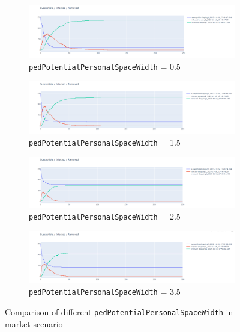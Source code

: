 \begin{figure}[H]
    \centering
    \begin{subfigure}[t]{\textwidth}
        \centering
        \includegraphics[width=\linewidth]{images/task5_shopping1.png}
        \caption{\texttt{pedPotentialPersonalSpaceWidth} = 0.5}
        \label{fig:t5-s1}
    \end{subfigure}%

    \begin{subfigure}[t]{\textwidth}
        \centering
        \includegraphics[width=\linewidth]{images/task5_shopping2.png}
        \caption{\texttt{pedPotentialPersonalSpaceWidth} = 1.5}
        \label{fig:t5-s2}
    \end{subfigure}

    \centering
    \begin{subfigure}[t]{\textwidth}
        \centering
        \includegraphics[width=\linewidth]{images/task5_shopping3.png}
        \caption{ \texttt{pedPotentialPersonalSpaceWidth} = 2.5}
        \label{fig:t5-s3}
    \end{subfigure}%
    
    \begin{subfigure}[t]{\textwidth}
        \centering
        \includegraphics[width=\linewidth]{images/task5_shopping4.png}
        \caption{\texttt{pedPotentialPersonalSpaceWidth} = 3.5}
        \label{fig:t5-s4}
    \end{subfigure}

    \caption{Comparison of different \texttt{pedPotentialPersonalSpaceWidth} in market scenario}
\end{figure}